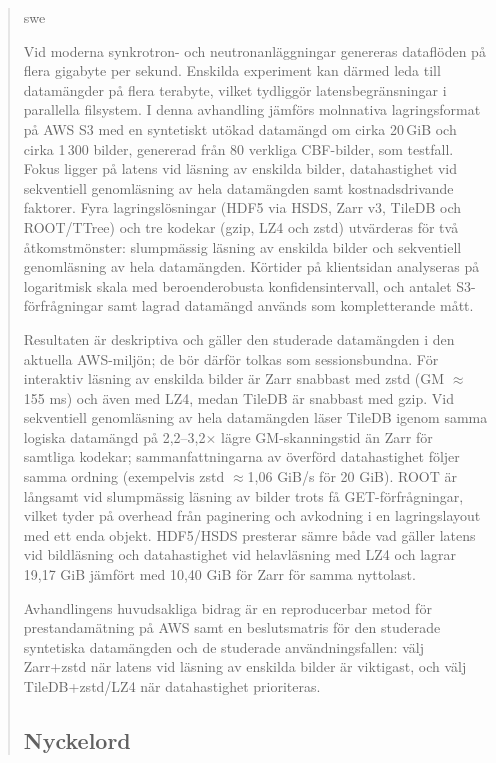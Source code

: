 \documentclass[nomenclature, english, bibtex]{kththesis}
\numberwithin{listing}{chapter}
\begin{document}
\cleardoublepage

\begin{abstract}
 \markboth{\abstractname}{}
\begin{scontents}[store-env=lang]
swe
\end{scontents}

\begin{scontents}[store-env=abstracts,print-env=true]
Vid moderna synkrotron- och neutronanläggningar genereras dataflöden på flera gigabyte per sekund. Enskilda experiment kan därmed leda till datamängder på flera terabyte, vilket tydliggör latensbegränsningar i parallella filsystem. I denna avhandling jämförs molnnativa lagringsformat på AWS S3 med en syntetiskt utökad datamängd om cirka 20\,GiB och cirka 1\,300 bilder, genererad från 80 verkliga CBF-bilder, som testfall. Fokus ligger på latens vid läsning av enskilda bilder, datahastighet vid sekventiell genomläsning av hela datamängden samt kostnadsdrivande faktorer. Fyra lagringslösningar (HDF5 via HSDS, Zarr v3, TileDB och ROOT/TTree) och tre kodekar (gzip, LZ4 och zstd) utvärderas för två åtkomstmönster: slumpmässig läsning av enskilda bilder och sekventiell genomläsning av hela datamängden. Körtider på klientsidan analyseras på logaritmisk skala med beroenderobusta konfidensintervall, och antalet S3-förfrågningar samt lagrad datamängd används som kompletterande mått.

Resultaten är deskriptiva och gäller den studerade datamängden i den aktuella AWS-miljön; de bör därför tolkas som sessionsbundna. För interaktiv läsning av enskilda bilder är Zarr snabbast med zstd (GM $\approx$155 ms) och även med LZ4, medan TileDB är snabbast med gzip. Vid sekventiell genomläsning av hela datamängden läser TileDB igenom samma logiska datamängd på 2,2--3,2$\times$ lägre GM-skanningstid än Zarr för samtliga kodekar; sammanfattningarna av överförd datahastighet följer samma ordning (exempelvis zstd $\approx$1,06 GiB/s för 20 GiB). ROOT är långsamt vid slumpmässig läsning av bilder trots få GET-förfrågningar, vilket tyder på overhead från paginering och avkodning i en lagringslayout med ett enda objekt. HDF5/HSDS presterar sämre både vad gäller latens vid bildläsning och datahastighet vid helavläsning med LZ4 och lagrar 19,17 GiB jämfört med 10,40 GiB för Zarr för samma nyttolast.

Avhandlingens huvudsakliga bidrag är en reproducerbar metod för prestandamätning på AWS samt en beslutsmatris för den studerade syntetiska datamängden och de studerade användningsfallen: välj Zarr+zstd när latens vid läsning av enskilda bilder är viktigast, och välj TileDB+zstd/LZ4 när datahastighet prioriteras.
\end{scontents}

\subsection*{Nyckelord}
\begin{scontents}[store-env=keywords,print-env=true]
\end{scontents}
\end{abstract}
\end{document}
